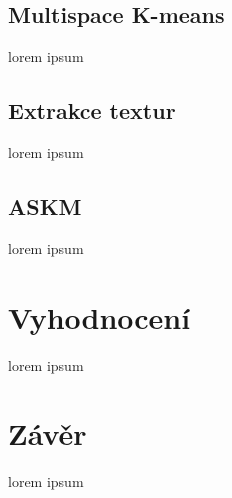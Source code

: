 \documentclass[fleqn,numbers=noenddot,headinclude,%
				11pt,a4paper,footinclude,%
				cleardoublepage=empty,abstractoff %
                ]{scrartcl}
\begin{document}
\subsection{Multispace K-means}
\label{sub:multi-k-means}
lorem ipsum

\subsection{Extrakce textur}
\label{sub:textury}
lorem ipsum

\subsection{ASKM}
\label{sub:askm}
lorem ipsum


\section{Vyhodnocení}
\label{sec:vyhodnoceni}
lorem ipsum

\section{Závěr}
\label{sec:zaver}
lorem ipsum
%
\end{document}
